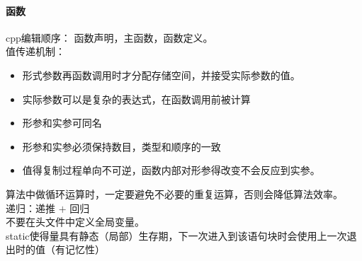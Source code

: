\documentclass[UTF8,a4paper]{ctexart}
\begin{document}
\paragraph{函数}
cpp编辑顺序： 函数声明，主函数，函数定义。\\
值传递机制：
\begin{itemize}
\item 形式参数再函数调用时才分配存储空间，并接受实际参数的值。\\
\item 实际参数可以是复杂的表达式，在函数调用前被计算\\
\item 形参和实参可同名\\
\item 形参和实参必须保持数目，类型和顺序的一致\\
\item 值得复制过程单向不可逆，函数内部对形参得改变不会反应到实参。\\
\end{itemize}
算法中做循环运算时，一定要避免不必要的重复运算，否则会降低算法效率。\\
递归：递推 $+$ 回归\\
不要在头文件中定义全局变量。\\
static使得量具有静态（局部）生存期，下一次进入到该语句块时会使用上一次退出时的值（有记忆性）\\
\end{document}

